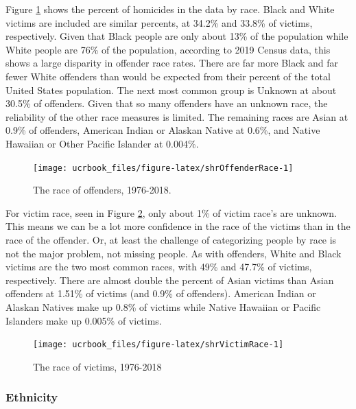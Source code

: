 \documentclass[
  12pt,
  openany]{book}
\begin{document}
Figure \ref{fig:shrOffenderRace} shows the percent of homicides in the data by race. Black and White victims are included are similar percents, at 34.2\% and 33.8\% of victims, respectively. Given that Black people are only about 13\% of the population while White people are 76\% of the population, according to 2019 Census data, this shows a large disparity in offender race rates. There are far more Black and far fewer White offenders than would be expected from their percent of the total United States population. The next most common group is Unknown at about 30.5\% of offenders. Given that so many offenders have an unknown race, the reliability of the other race measures is limited. The remaining races are Asian at 0.9\% of offenders, American Indian or Alaskan Native at 0.6\%, and Native Hawaiian or Other Pacific Islander at 0.004\%.

\begin{figure}

{\centering \texttt{[image: ucrbook\_files/figure-latex/shrOffenderRace-1]} 

}

\caption{The race of offenders, 1976-2018.}\label{fig:shrOffenderRace}
\end{figure}

For victim race, seen in Figure \ref{fig:shrVictimRace}, only about 1\% of victim race's are unknown. This means we can be a lot more confidence in the race of the victims than in the race of the offender. Or, at least the challenge of categorizing people by race is not the major problem, not missing people. As with offenders, White and Black victims are the two most common races, with 49\% and 47.7\% of victims, respectively. There are almost double the percent of Asian victims than Asian offenders at 1.51\% of victims (and 0.9\% of offenders). American Indian or Alaskan Natives make up 0.8\% of victims while Native Hawaiian or Pacific Islanders make up 0.005\% of victims.

\begin{figure}

{\centering \texttt{[image: ucrbook\_files/figure-latex/shrVictimRace-1]} 

}

\caption{The race of victims, 1976-2018}\label{fig:shrVictimRace}
\end{figure}

\hypertarget{ethnicity-1}{%
\subsubsection{Ethnicity}\label{ethnicity-1}}
\end{document}
